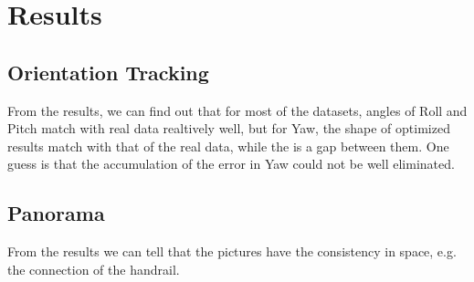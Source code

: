 \documentclass[conference]{IEEEtran}
\begin{document}
\section{Results}
\subsection{Orientation Tracking}
From the results, we can find out that for most of the datasets, angles of Roll and Pitch match with real data realtively
well, but for Yaw, the shape of optimized results match with that of the real data, while the is a gap between them. One
guess is that the accumulation of the error in Yaw could not be well eliminated.

\subsection{Panorama}
From the results we can tell that the pictures have the consistency in space, e.g. the connection of the handrail.
\end{document}
